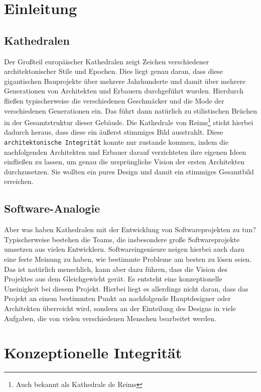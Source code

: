 \documentclass[a4paper, ngerman, 12pt, usenames, dvipsnames]{article}
\begin{document}
\tableofcontents
\thispagestyle{empty}
\pagebreak

\section{Einleitung}
\subsection{Kathedralen}
Der Großteil europäischer Kathedralen zeigt Zeichen verschiedener architektonischer Stile und Epochen.
Dies liegt genau daran, dass diese gigantischen Bauprojekte über mehrere Jahrhunderte und damit über mehrere Generationen von Architekten und Erbauern durchgeführt wurden.
Hierdurch fließen typischerweise die verschiedenen Geschmäcker und die Mode der verschiedenen Generationen ein.
Das führt dann natürlich zu stilistischen Brüchen in der Gesamtstruktur dieser Gebäude.
Die Kathedrale von Reims\footnote{Auch bekannt als Kathedrale de Reims} sticht hierbei dadurch heraus, dass diese ein äußerst stimmiges Bild ausstrahlt.
Diese \texttt{architektonische Integrität} konnte nur zustande kommen, indem die nachfolgenden Architekten und Erbauer darauf verzichteten ihre eigenen Ideen einfließen zu lassen, um genau die ursprüngliche Vision der ersten Architekten durchzusetzen. Sie wollten ein pures Design und damit ein stimmiges Gesamtbild erreichen. \cite{Brooks1975}

\subsection{Software-Analogie}
Aber was haben Kathedralen mit der Entwicklung von Softwareprojekten zu tun? Typischerweise bestehen die Teams, die insbesondere große Softwareprojekte umsetzen aus vielen Entwicklern. Softwareingenieure neigen hierbei auch dazu eine feste Meinung zu haben, wie bestimmte Probleme am besten zu lösen seien. Das ist natürlich menschlich, kann aber dazu führen, dass die Vision des Projektes aus dem Gleichgewicht gerät. Es entsteht eine konzeptionelle Uneinigkeit bei diesem Projekt. Hierbei liegt es allerdings nicht daran, dass das Projekt an einem bestimmten Punkt an nachfolgende Hauptdesigner oder Architekten überreicht wird, sondern an der Einteilung des Designs in viele Aufgaben, die von vielen verschiedenen Menschen bearbeitet werden. \cite{Brooks1975}

\pagebreak
\section{Konzeptionelle Integrität}
\end{document}
